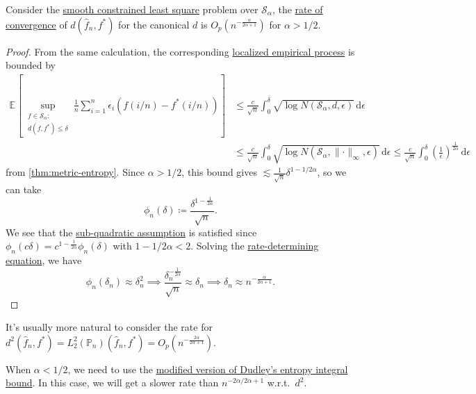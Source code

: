 \begin{theorem}\label{thm:fixed-design-non-parametric-LS}
	Consider the \hyperref[prb:smooth-LS]{smooth constrained least square} problem over \(\mathcal{S} _\alpha \), the \hyperref[def:rate-of-convergence]{rate of convergence} of \(d(\hat{f} _n, f^{\ast} )\) for the canonical \(d\) is \(O_p(n^{- \frac{\alpha }{2\alpha + 1}})\) for \(\alpha > 1 / 2\).
\end{theorem}
\begin{proof}
	From the same calculation, the corresponding \hyperref[def:localized-EP]{localized empirical process} is bounded by
	\[
		\begin{split}
			\mathbb{E}_{}\left[\sup _{\substack{f\in \mathcal{S} _\alpha \colon                                                                               \\ d(f, f^{\ast} ) \leq \delta }} \frac{1}{n} \sum_{i=1}^{n} \epsilon _i \left( f (i / n) - f^{\ast} (i / n) \right) \right]
			 & \leq \frac{c}{\sqrt{n} } \int_{0}^{\delta } \sqrt{\log N(\mathcal{S} _\alpha , d, \epsilon )}  \,\mathrm{d}\epsilon                            \\
			 & \leq \frac{c}{\sqrt{n} } \int_{0}^{\delta } \sqrt{\log N(\mathcal{S} _\alpha , \lVert \cdot \rVert _\infty , \epsilon )}  \,\mathrm{d}\epsilon
			\leq \frac{c}{\sqrt{n} } \int_{0}^{\delta } \left( \frac{1}{\epsilon } \right) ^{\frac{1}{2\alpha } } \,\mathrm{d}\epsilon
		\end{split}
	\]
	from \autoref{thm:metric-entropy}. Since \(\alpha > 1 / 2\), this bound gives \(\lesssim \frac{1}{\sqrt{n} } \delta ^{1 - 1 / 2\alpha }\), so we can take
	\[
		\phi _n(\delta ) \coloneqq \frac{\delta ^{1 - \frac{1}{2\alpha } }}{\sqrt{n} }.
	\]
	We see that the \hyperref[def:sub-quadratic-assumption]{sub-quadratic assumption} is satisfied since \(\phi _n(c \delta) = c^{1 - \frac{1}{2\alpha }} \phi _n (\delta )\) with \(1 - 1 / 2\alpha < 2\). Solving the \hyperref[def:rate-determining-equation]{rate-determining equation}, we have
	\[
		\phi _n(\delta _n) \approx \delta _n^2
		\implies \frac{\delta _n^{-\frac{1}{2\alpha }}}{\sqrt{n} } \approx \delta_n
		\implies \delta _n\approx n^{- \frac{\alpha}{2\alpha +1}} .
	\]
\end{proof}

It's usually more natural to consider the rate for \(d^2(\hat{f} _n, f^{\ast} ) = L_2^2(\mathbb{P} _n) (\hat{f} _n, f^{\ast} ) = O_p(n^{-\frac{2\alpha }{2\alpha +1}})\).

\begin{note}
	When \(\alpha < 1 / 2\), we need to use the \hyperref[col:Dudley-integral-entropy-bound-finite-resolution]{modified version of Dudley's entropy integral bound}. In this case, we will get a slower rate than \(n^{-2\alpha / 2\alpha + 1}\) w.r.t.\ \(d^2\).
\end{note}

